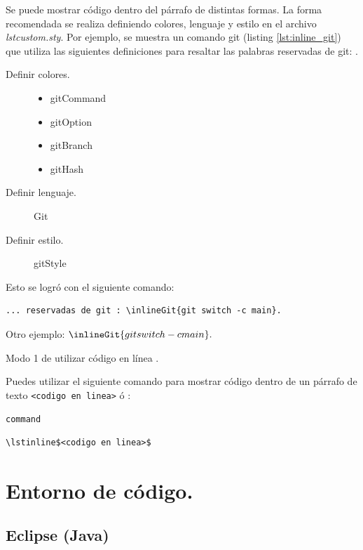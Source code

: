 Se puede mostrar código dentro del párrafo de distintas formas. La forma recomendada se realiza definiendo colores, lenguaje y estilo en el archivo \emph{lstcustom.sty}. Por ejemplo, se muestra un comando git (listing \ref{lst:inline_git}) que utiliza las siguientes definiciones para resaltar las palabras reservadas de git: .
\begin{description}
	\item[Definir colores.] 
	\item[]
	\begin{itemize}
		\item gitCommand
		\item gitOption
		\item gitBranch
		\item gitHash
	\end{itemize}
	\item[Definir lenguaje.] Git
	\item[Definir estilo.] gitStyle
\end{description}

Esto se logró con el siguiente comando:

\begin{lstlisting}[caption={Código en línea con resaltado de palabras para git.}, label={lst:inline_git}, style=terminal]
... reservadas de git : \inlineGit{git switch -c main}.
\end{lstlisting}


Otro ejemplo: \codeinline$\inlineGit{git switch -c main}.$

Modo 1 de utilizar código en línea .

Puedes utilizar el siguiente comando para mostrar código dentro de un párrafo de texto \lstinline[style=terminal]$<codigo en linea>$ ó :

 

\lstinline[basicstyle=\small\ttfamily\color{darkgray},frame=single]$command$

\begin{lstlisting}[caption={A simple listing.}, label={lst:simple}]
	\lstinline$<codigo en linea>$
\end{lstlisting}


\section{Entorno de código.}

\subsection{Eclipse (Java)}

